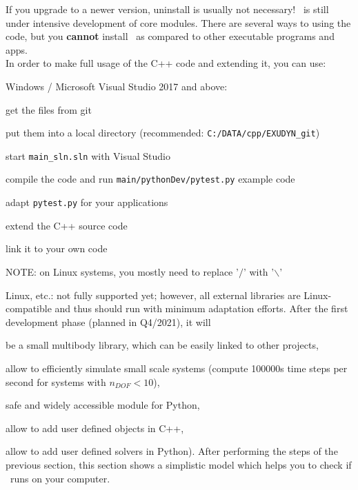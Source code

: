 If you upgrade to a newer version, uninstall is usually not necessary!
%
\codeName\ is still under intensive development of core modules.
There are several ways to using the code, but you {\bf cannot} install \codeName\ as compared to other executable programs and apps.
\vspace{6pt}\\
In order to make full usage of the C++ code and extending it, you can use:
\bi
	\item Windows / Microsoft Visual Studio 2017 and above:
	\bi
		\item get the files from git
		\item put them into a local directory (recommended: \texttt{C:/DATA/cpp/EXUDYN\_git})
		\item start \texttt{main\_sln.sln} with Visual Studio
		\item compile the code and run \texttt{main/pythonDev/pytest.py} example code
		\item adapt \texttt{pytest.py} for your applications
		\item extend the C++ source code
		\item link it to your own code
		\item NOTE: on Linux systems, you mostly need to replace '$/$' with '$\backslash$'
	\ei
	\item Linux, etc.: not fully supported yet; however, all external libraries are Linux-compatible and thus should run with minimum adaptation efforts.
\ei
%
After the first development phase (planned in Q4/2021), it will
\bi
  \item be a small multibody library, which can be easily linked to other projects,
	\item allow to efficiently simulate small scale systems (compute 100000s time steps per second for systems with $n_{DOF}<10$),
	\item safe and widely accessible module for Python,
	\item allow to add user defined objects in C++,
	\item allow to add user defined solvers in Python).
\ei
%
After performing the steps of the previous section, this section shows a simplistic model which helps you to check if \codeName\ runs on your computer.

